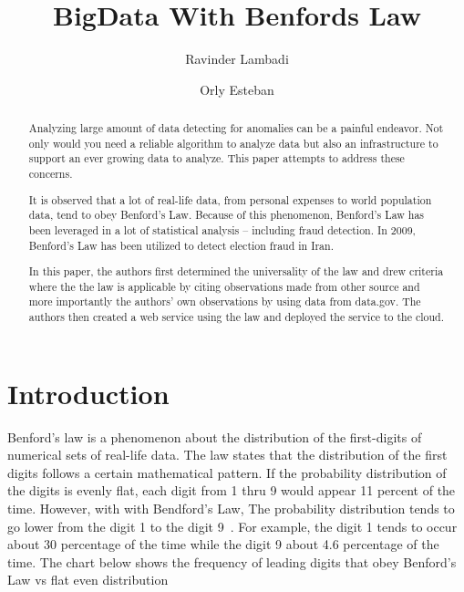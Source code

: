 
\title{BigData With Benfords Law}

\author{Ravinder Lambadi}


\author{Orly Esteban}

\begin{abstract}
Analyzing large amount of data detecting for anomalies 
can be a painful endeavor. Not only would you need a 
reliable algorithm to analyze data but also an 
infrastructure to support an ever growing data to 
analyze. This paper attempts to address these concerns. 

It is observed that a lot of real-life data, 
from personal expenses to world population data, 
tend to obey Benford’s Law. Because of this phenomenon, 
Benford’s Law has been leveraged 
in a lot of statistical analysis – including fraud 
detection. In 2009,  Benford’s Law has been utilized 
to detect election fraud in Iran.

In this paper, the authors first determined 
the universality of the law and drew criteria 
where the the law is applicable by citing 
observations made from other source and more 
importantly the authors’ own observations by 
using data from data.gov. The authors then 
created a web service using the law and deployed 
the service to the cloud.

\end{abstract}


\maketitle

\section{Introduction}
Benford’s law is a phenomenon about the distribution 
of the first-digits of numerical sets of real-life data. 
The law states that the distribution of the first digits
follows a certain mathematical pattern. If the probability 
distribution of the digits is evenly flat, each digit from 
1 thru 9 would appear 11 percent of the time. However, 
with with Bendford’s Law, The probability distribution 
tends to go lower from the digit 1 to the digit 
9~\cite{hid-sp18-514-benfordwiki}.
For example, the digit 1 tends to occur about 30 percentage 
of the time while the digit 9 about 4.6 percentage 
of the time. The chart below shows the frequency of 
leading digits that obey Benford’s Law vs flat even distribution


